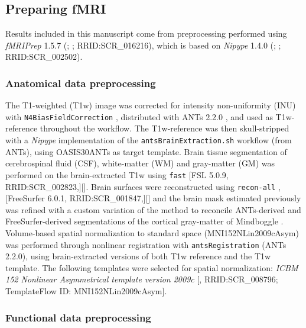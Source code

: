 \documentclass[10pt,letterpaper]{article}
\begin{document}
\subsection*{Preparing fMRI}
\label{methods:fmriprep}

Results included in this manuscript come from preprocessing performed
using \emph{fMRIPrep} 1.5.7 (\cite{fmriprep1}; \cite{fmriprep2}; RRID:SCR\_016216),
which is based on \emph{Nipype} 1.4.0
(\cite{nipype1}; \cite{nipype2}; RRID:SCR\_002502).


\subsubsection*{Anatomical data preprocessing}
\label{methods:anat}

The T1-weighted (T1w) image was corrected for intensity non-uniformity
(INU) with \texttt{N4BiasFieldCorrection} \cite{n4}, distributed with
ANTs 2.2.0 \cite[RRID:SCR\_004757]{ants}, and used as T1w-reference
throughout the workflow.
The T1w-reference was then skull-stripped with a \emph{Nipype} implementation
of the \texttt{antsBrainExtraction.sh} workflow (from ANTs), using OASIS30ANTs
as target template.
Brain tissue segmentation of cerebrospinal fluid (CSF), white-matter (WM) and
gray-matter (GM) was performed on the brain-extracted T1w using
\texttt{fast} \cite{fsl_fast} [FSL 5.0.9, RRID:SCR\_002823,][].
Brain surfaces were reconstructed using \texttt{recon-all} \cite{fs_reconall},
[FreeSurfer 6.0.1, RRID:SCR\_001847,][] and the brain mask estimated
previously was refined with a custom variation of the method to
reconcile ANTs-derived and FreeSurfer-derived segmentations of the
cortical gray-matter of Mindboggle \cite[RRID:SCR\_002438,]{mindboggle}.
Volume-based spatial normalization to standard space (MNI152NLin2009cAsym)
was performed through nonlinear registration with \texttt{antsRegistration}
(ANTs 2.2.0), using brain-extracted versions of both T1w reference and the T1w template.
The following templates were selected for spatial normalization: \emph{ICBM 152 Nonlinear
Asymmetrical template version 2009c} {[}\cite{mni152nlin2009casym},
RRID:SCR\_008796; TemplateFlow ID: MNI152NLin2009cAsym{]}.

\subsubsection*{Functional data preprocessing}
\label{methods:func}
\end{document}
